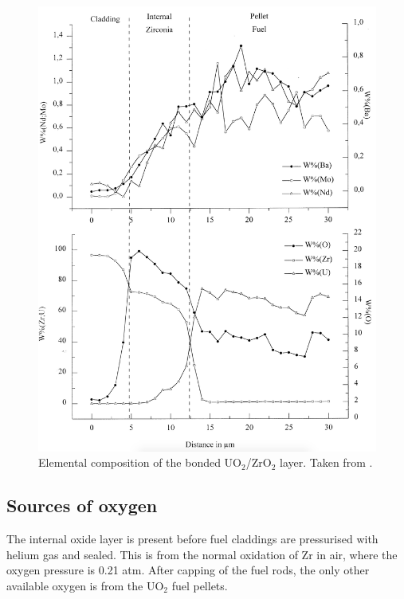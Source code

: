 \begin{figure}[htp]
\centering
\includegraphics[width=14cm]{images/bonding_layer_composition.png}
\caption[Elemental composition of the bonded UO$_{2}$/ZrO$_{2}$ layer.]{Elemental composition of the bonded UO$_{2}$/ZrO$_{2}$ layer. Taken from \cite{Lozano1998}.}
\label{figure:bonding_layer_composition}
\end{figure}



\subsection{Sources of oxygen}

The internal oxide layer is present before fuel claddings are pressurised with helium gas and sealed. This is from the normal oxidation of Zr in air, where the oxygen pressure is 0.21 atm. After capping of the fuel rods, the only other available oxygen is from the UO$_{2}$ fuel pellets.

